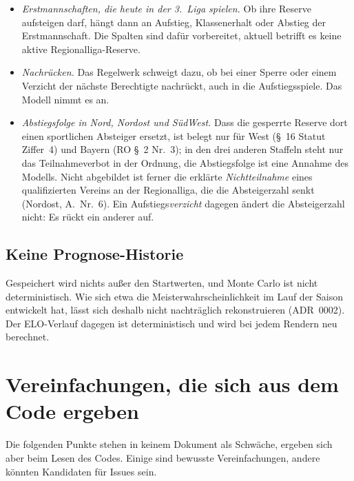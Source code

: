 \begin{itemize}
  \item \emph{Erstmannschaften, die heute in der 3.~Liga spielen.} Ob ihre
        Reserve aufsteigen darf, hängt dann an Aufstieg, Klassenerhalt oder
        Abstieg der Erstmannschaft. Die Spalten
         sind dafür vorbereitet, aktuell betrifft
        es keine aktive Regionalliga-Reserve.
  \item \emph{Nachrücken.} Das Regelwerk schweigt dazu, ob bei einer Sperre
        oder einem Verzicht der nächste Berechtigte nachrückt, auch in die
        Aufstiegsspiele. Das Modell nimmt es an.
  \item \emph{Abstiegsfolge in Nord, Nordost und SüdWest.} Dass die gesperrte
        Reserve dort einen sportlichen Absteiger ersetzt, ist belegt nur für
        West (§~16 Statut Ziffer~4) und Bayern (RO §~2 Nr.~3); in den drei
        anderen Staffeln steht nur das Teilnahmeverbot in der Ordnung, die
        Abstiegsfolge ist eine Annahme des Modells. Nicht abgebildet ist
        ferner die erklärte \emph{Nichtteilnahme} eines qualifizierten Vereins
        an der Regionalliga, die die Absteigerzahl senkt (Nordost, A.~Nr.~6).
        Ein Aufstiegs\emph{verzicht} dagegen ändert die Absteigerzahl nicht:
        Es rückt ein anderer auf.
\end{itemize}

\subsection{Keine Prognose-Historie}

Gespeichert wird nichts außer den Startwerten, und Monte Carlo ist nicht
deterministisch. Wie sich etwa die Meisterwahrscheinlichkeit im Lauf der
Saison entwickelt hat, lässt sich deshalb nicht nachträglich rekonstruieren
(ADR~0002). Der ELO-Verlauf dagegen ist deterministisch und wird bei jedem
Rendern neu berechnet.

\section{Vereinfachungen, die sich aus dem Code ergeben}

Die folgenden Punkte stehen in keinem Dokument als Schwäche, ergeben sich
aber beim Lesen des Codes. Einige sind bewusste Vereinfachungen, andere
könnten Kandidaten für Issues sein.

